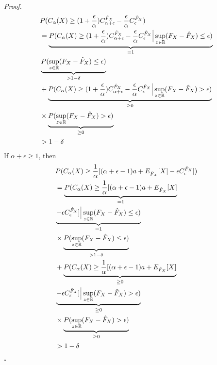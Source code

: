 \documentclass[letterpaper]{article} %
\newenvironment{proof}{\noindent\textit{Proof.}}{\hfill$\square$}
\begin{document}
\begin{proof}
\begin{equation}
\begin{aligned}
			&P(C_\alpha(X)\geq (1+\frac{\epsilon}{\alpha})C_{\alpha+\epsilon}^{\hat{F}_X}-\frac{\epsilon}{\alpha}C_{\epsilon}^{\hat{F}_X}) \\
			&= \underbrace{P(C_\alpha(X)\geq (1+\frac{\epsilon}{\alpha})C_{\alpha+\epsilon}^{\hat{F}_X}-\frac{\epsilon}{\alpha}C_{\epsilon}^{\hat{F}_X}\Bigr{|} \sup_{z\in\mathbb{R}}(F_X-\hat{F}_X)\leq \epsilon)}_{=1} \\ &\underbrace{P(\sup_{z\in\mathbb{R}}(F_X-\hat{F}_X)\leq \epsilon)}_{>1-\delta} \\
			&+\underbrace{P(C_\alpha(X)\geq (1+\frac{\epsilon}{\alpha})C_{\alpha+\epsilon}^{\hat{F}_X}-\frac{\epsilon}{\alpha}C_{\epsilon}^{\hat{F}_X}\Bigr{|} \sup_{z\in\mathbb{R}}(F_X-\hat{F}_X) > \epsilon)}_{\geq 0} \\
			&\times \underbrace{P(\sup_{z\in\mathbb{R}}(F_X-\hat{F}_X) > \epsilon)}_{\geq 0} \\
			&> 1-\delta
		\end{aligned}
	\end{equation}
	If $\alpha+\epsilon \geq 1$, then \begin{equation}
		\begin{aligned}
			&P(C_\alpha(X) \geq \frac{1}{\alpha}[(\alpha+\epsilon - 1)a + E_{\hat{F}_X}[X] - \epsilon C_\epsilon^{\hat{F}_X}]) \\ 
			&=\underbrace{P(C_\alpha(X) \geq \frac{1}{\alpha}[(\alpha+\epsilon - 1)a + E_{\hat{F}_X}[X]}_{=1} \\
			&\underbrace{- \epsilon C_\epsilon^{\hat{F}_X}]\Bigr{|} \sup_{z\in\mathbb{R}}(F_X-\hat{F}_X)\leq \epsilon)}_{=1} \\ 
			&\times \underbrace{P(\sup_{z\in\mathbb{R}}(F_X-\hat{F}_X) \leq \epsilon)}_{>1-\delta} \\
			&+\underbrace{P(C_\alpha(X) \geq \frac{1}{\alpha}[(\alpha+\epsilon - 1)a + E_{\hat{F}_X}[X]}_{\geq 0} \\
			&\underbrace{- \epsilon C_\epsilon^{\hat{F}_X}]\Bigr{|} \sup_{z\in\mathbb{R}}(F_X-\hat{F}_X) > \epsilon)}_{\geq 0} \\ 
			&\times \underbrace{P(\sup_{z\in\mathbb{R}}(F_X-\hat{F}_X) > \epsilon)}_{\geq 0} \\
			&> 1-\delta
		\end{aligned}
	\end{equation}
\end{proof}
\end{document}
